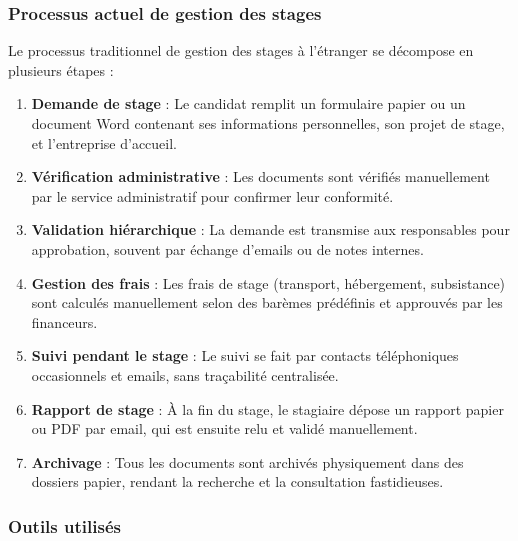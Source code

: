 \documentclass[12pt,a4paper]{report}
\begin{document}
\subsubsection{Processus actuel de gestion des stages}

Le processus traditionnel de gestion des stages à l'étranger se décompose en plusieurs étapes :

\begin{enumerate}[leftmargin=1cm]
    \item \textbf{Demande de stage} : Le candidat remplit un formulaire papier ou un document Word contenant ses informations personnelles, son projet de stage, et l'entreprise d'accueil.
    
    \item \textbf{Vérification administrative} : Les documents sont vérifiés manuellement par le service administratif pour confirmer leur conformité.
    
    \item \textbf{Validation hiérarchique} : La demande est transmise aux responsables pour approbation, souvent par échange d'emails ou de notes internes.
    
    \item \textbf{Gestion des frais} : Les frais de stage (transport, hébergement, subsistance) sont calculés manuellement selon des barèmes prédéfinis et approuvés par les financeurs.
    
    \item \textbf{Suivi pendant le stage} : Le suivi se fait par contacts téléphoniques occasionnels et emails, sans traçabilité centralisée.
    
    \item \textbf{Rapport de stage} : À la fin du stage, le stagiaire dépose un rapport papier ou PDF par email, qui est ensuite relu et validé manuellement.
    
    \item \textbf{Archivage} : Tous les documents sont archivés physiquement dans des dossiers papier, rendant la recherche et la consultation fastidieuses.
\end{enumerate}

\subsubsection{Outils utilisés}
\end{document}
